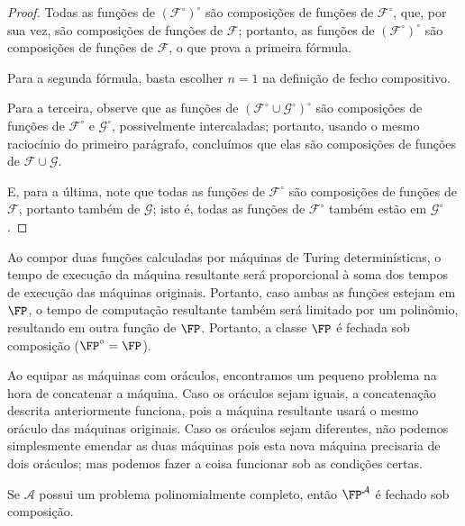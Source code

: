 \begin{proof}
    Todas as funções de $(\mathcal F^\circ)^\circ$
    são composições de funções de $\mathcal F^\circ$,
    que, por sua vez,
    são composições de funções de $\mathcal F$;
    portanto, as funções de $(\mathcal F^\circ)^\circ$
    são composições de funções de $\mathcal F$,
    o que prova a primeira fórmula.

    Para a segunda fórmula,
    basta escolher $n = 1$ na definição de fecho compositivo.

    Para a terceira,
    observe que as funções de $(\mathcal F^\circ \cup \mathcal G^\circ)^\circ$
    são composições de funções de $\mathcal F^\circ$ e $\mathcal G^\circ$,
    possivelmente intercaladas;
    portanto, usando o mesmo raciocínio do primeiro parágrafo,
    concluímos que elas são composições de funções de
    $\mathcal F \cup \mathcal G$.

    E, para a última,
    note que todas as funções de $\mathcal F^\circ$
    são composições de funções de $\mathcal F$,
    portanto também de $\mathcal G$;
    isto é, todas as funções de $\mathcal F^\circ$
    também estão em $\mathcal G^\circ$.
\end{proof}

Ao compor duas funções calculadas por máquinas de Turing determinísticas,
o tempo de execução da máquina resultante
será proporcional à soma dos tempos de execução das máquinas originais.
Portanto,
caso ambas as funções estejam em $\FP$,
o tempo de computação resultante também será limitado por um polinômio,
resultando em outra função de $\FP$.
Portanto,
a classe $\FP$ é fechada sob composição
($\FP^\circ = \FP$).

Ao equipar as máquinas com oráculos,
encontramos um pequeno problema na hora de concatenar a máquina.
Caso os oráculos sejam iguais,
a concatenação descrita anteriormente funciona,
pois a máquina resultante usará o mesmo oráculo das máquinas originais.
Caso os oráculos sejam diferentes,
não podemos simplesmente emendar as duas máquinas
pois esta nova máquina precisaria de dois oráculos;
mas podemos fazer a coisa funcionar sob as condições certas.

\begin{theorem}
    Se $\mathcal A$ possui um problema polinomialmente completo,
    então $\FP^\mathcal A$ é fechado sob composição.
    \label{thm:fp_closed_under_composition}
\end{theorem}

